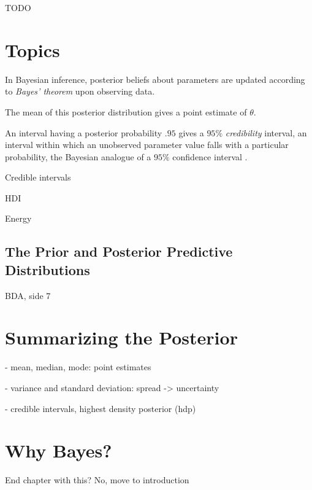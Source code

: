 TODO

\section{Topics} 

In Bayesian inference, posterior beliefs about parameters are updated according to \textit{Bayes' theorem} upon observing data.  

The mean of this posterior distribution gives a point estimate of $\theta$. 

An interval having a posterior probability $.95$ gives a $95\%$ \textit{credibility} interval, an interval within which an unobserved parameter value falls with a particular probability, the Bayesian analogue of a $95\%$ confidence interval \cite[p. 777]{STK}.

Credible intervals 

HDI 

Energy


\subsection{The Prior and Posterior Predictive Distributions}\label{sec:predictive}

BDA, side 7

\section{Summarizing the Posterior}

- mean, median, mode: point estimates

- variance and standard deviation: spread -> uncertainty 

- credible intervals, highest density posterior (hdp) 



\section{Why Bayes?}

End chapter with this? No, move to introduction
